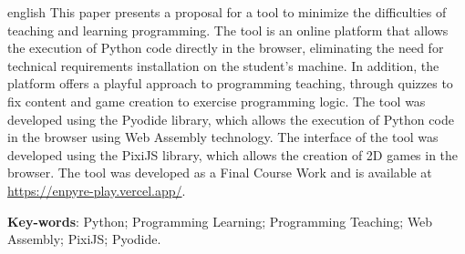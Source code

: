 \begin{resumo}[Abstract]
 \begin{otherlanguage*}{english}
  This paper presents a proposal for a tool to minimize the difficulties of teaching and learning programming. The tool is an online platform that allows the execution of Python code directly in the browser, eliminating the need for technical requirements installation on the student's machine. In addition, the platform offers a playful approach to programming teaching, through quizzes to fix content and game creation to exercise programming logic. The tool was developed using the Pyodide library, which allows the execution of Python code in the browser using Web Assembly technology. The interface of the tool was developed using the PixiJS library, which allows the creation of 2D games in the browser. The tool was developed as a Final Course Work and is available at \url{https://enpyre-play.vercel.app/}.

  \vspace{\onelineskip}

  \noindent 
  \textbf{Key-words}: Python; Programming Learning; Programming Teaching; Web Assembly; PixiJS; Pyodide.
 \end{otherlanguage*}
\end{resumo}
